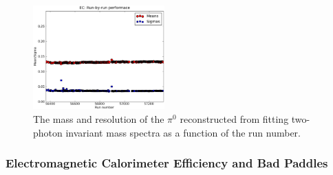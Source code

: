 \begin{figure}[htpb]
\begin{center}
 \includegraphics[width=0.45\textwidth]{figures/calib/ec/ec_pi0mass.eps}
  \caption{The mass and resolution of the $\pi^0$ reconstructed from fitting two-photon invariant mass spectra as a function of the run number.}
  \label{ecpi0m}
  \end{center}
\end{figure}
%
%
%
%
\FloatBarrier

\subsubsection{\label{sec:calib.ec.eff}Electromagnetic Calorimeter Efficiency and Bad Paddles}

